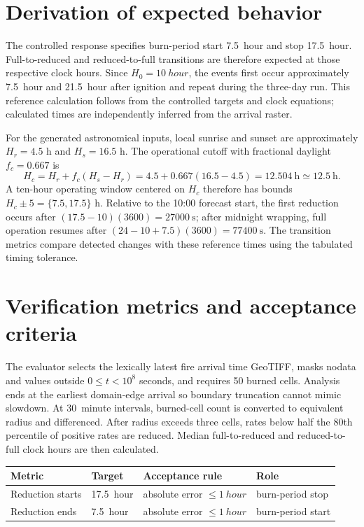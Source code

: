\section{Derivation of expected behavior}

The controlled response specifies burn-period start \SI{7.5}{hour} and stop \SI{17.5}{hour}. Full-to-reduced and reduced-to-full transitions are therefore expected at those respective clock hours. Since $H_0=\SI{10}{hour}$, the events first occur approximately \SI{7.5}{hour} and \SI{21.5}{hour} after ignition and repeat during the three-day run. This reference calculation follows from the controlled targets and clock equations; calculated times are independently inferred from the arrival raster.

For the generated astronomical inputs, local sunrise and sunset are
approximately \(H_r=4.5\) h and \(H_s=16.5\) h.  The operational cutoff
with fractional daylight \(f_c=0.667\) is
\[
 H_c=H_r+f_c(H_s-H_r)=4.5+0.667(16.5-4.5)
 =12.504~\mathrm{h}\simeq12.5~\mathrm{h}.
\]
A ten-hour operating window centered on \(H_c\) therefore has bounds
\(H_c\pm5=\{7.5,17.5\}\) h.  Relative to the 10:00 forecast start, the
first reduction occurs after
\((17.5-10)(3600)=27000~\mathrm{s}\); after midnight wrapping, full
operation resumes after \((24-10+7.5)(3600)=77400~\mathrm{s}\).
The transition metrics compare detected changes with these reference
times using the tabulated timing tolerance.

\section{Verification metrics and acceptance criteria}

The evaluator selects the lexically latest fire arrival time GeoTIFF, masks nodata and values outside $0\le t<10^{8}$ seconds, and requires 50 burned cells. Analysis ends at the earliest domain-edge arrival so boundary truncation cannot mimic slowdown. At \SI{30}{minute} intervals, burned-cell count is converted to equivalent radius and differenced. After radius exceeds three cells, rates below half the 80th percentile of positive rates are reduced. Median full-to-reduced and reduced-to-full clock hours are then calculated.

\begin{center}\begin{tabular}{@{}llll@{}}
\toprule Metric & Target & Acceptance rule & Role \\
\midrule
Reduction starts & \SI{17.5}{hour} & absolute error $\le\SI{1}{hour}$ & burn-period stop \\
Reduction ends & \SI{7.5}{hour} & absolute error $\le\SI{1}{hour}$ & burn-period start \\
\bottomrule\end{tabular}\end{center}

